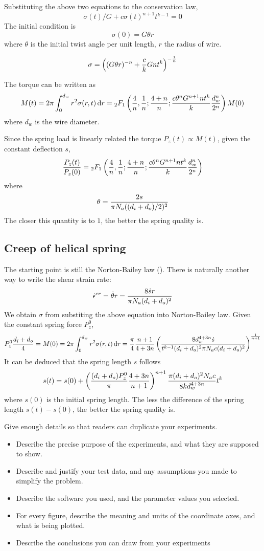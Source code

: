 \documentclass[10pt]{article}
\begin{document}
Substituting the above two equations to the conservation law,
\begin{equation} \label{eq:diff}
\dot{\sigma}(t)/G+c\sigma(t)^{n+1} t^{k-1}=0
\end{equation}
The initial condition is
\[
\sigma (0) = G\theta r
\]
where $\theta$ is the initial twist angle per unit length, $r$ the radius of wire.

\[
\sigma = \left( (G\theta r)^{-n} + {c\over k} Gnt^k \right)^{-{1\over n}}
\]

The torque can be written as
\[
M(t) = 2\pi \int_0^{d_w} r^2 \sigma(r,t)\,\mathrm{d} r ={}_{2}F_1 \left( {4\over n},{1\over n};{4+n\over n};{c\theta^n G^{n+1} n t^k\over k} {d_w^n\over 2^n}\right) M(0)
\]
where $d_w$ is the wire diameter.

Since the spring load is linearly related the torque $P_z(t)\propto M(t)$, given the constant deflection $s$,
\[
{P_z(t)\over P_z(0)} = {}_{2}F_1 \left( {4\over n},{1\over n};{4+n\over n};{c\theta^n G^{n+1} n t^k\over k} {d_w^n\over 2^n}\right)
\]
where
\[
\theta = {2s\over \pi N_a ((d_i+d_o)/2)^2}
\]
The closer this quantity is to $1$, the better the spring quality is.

\subsection{Creep of helical spring}
The starting point is still the Norton-Bailey law (\label{eq:N-B}). There is naturally another way to write the shear strain rate:
\[
\dot{\epsilon}^{cr} = \dot{\theta} r = {8\dot{s} r\over \pi N_a (d_i+d_o)^2}
\]
We obtain $\sigma$ from substiting the above equation into Norton-Bailey law. Given the constant spring force $P_z^0$,
\[
P_z^0{d_i+d_o\over 4}=M(0)=2\pi\int_0^{d_w} r^2 \sigma(r,t)\,\mathrm{d} r
={\pi\over 4}{n+1\over 4+3n}\left( {8d_w^{4+3n}\dot{s} \over t^{k-1} (d_i+d_o)^2 \pi N_a c (d_i+d_o)^2} \right)^{{1\over n+1}}
\]
It can be deduced that the spring length $s$ follows
\[
s(t) = s(0) + \left( {(d_i+d_o)P_z^0\over \pi}{4+3n\over n+1} \right)^{n+1} {\pi (d_i+d_o)^2 N_a c\over 8kd_w^{4+3n}} t^k
\]
where $s(0)$ is the initial spring length. The less the difference of the spring length $s(t)-s(0)$, the better the spring quality is.

Give enough details so that readers can duplicate your experiments.

\begin{itemize}
\item Describe the precise purpose of the experiments, and what they 
are supposed to show.

\item Describe and justify your test data, and any assumptions you made to 
simplify the problem.

\item Describe the software you used, and the 
parameter values you selected.

\item 
For every figure, describe the meaning and units of the coordinate axes, 
and what is being plotted.

\item Describe the conclusions you can draw from your experiments
\end{itemize}
\end{document}
